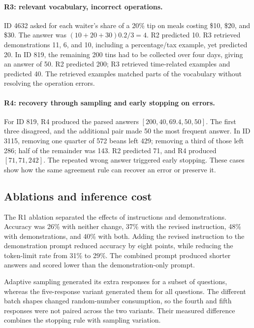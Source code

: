 \documentclass{article}
\begin{document}
\paragraph{R3: relevant vocabulary, incorrect operations.}
ID 4632 asked for each waiter's share of a 20\% tip on meals costing
\$10, \$20, and \$30. The answer was $(10+20+30)0.2/3=4$.
R2 predicted 10. R3 retrieved demonstrations 11, 6, and 10, including a
percentage/tax example, yet predicted 20.
In ID 819, the remaining 200 tins had to be collected over four days,
giving an answer of 50. R2 predicted 200; R3 retrieved time-related examples
and predicted 40. The retrieved examples matched parts of the vocabulary
without resolving the operation errors.

\paragraph{R4: recovery through sampling and early stopping on errors.}
For ID 819, R4 produced the parsed answers $[200,40,69.4,50,50]$.
The first three disagreed, and the additional pair made 50 the most frequent
answer. In ID 3115, removing one quarter of 572 beans left 429;
removing a third of those left 286; half of the remainder was 143.
R2 predicted 71, and R4 produced $[71,71,242]$. The repeated wrong answer
triggered early stopping. These cases show how the same agreement rule
can recover an error or preserve it.

\subsection{Ablations and inference cost}
The R1 ablation separated the effects of instructions and demonstrations.
Accuracy was 26\% with neither change, 37\% with the revised instruction,
48\% with demonstrations, and 40\% with both. Adding the revised instruction
to the demonstration prompt reduced accuracy by eight points, while reducing
the token-limit rate from 31\% to 29\%. The combined prompt produced shorter
answers and scored lower than the demonstration-only prompt.


Adaptive sampling generated its extra responses for a subset of questions,
whereas the five-response variant generated them for all questions.
The different batch shapes changed random-number consumption, so the fourth
and fifth responses were not paired across the two variants. Their measured
difference combines the stopping rule with sampling variation.
\end{document}
